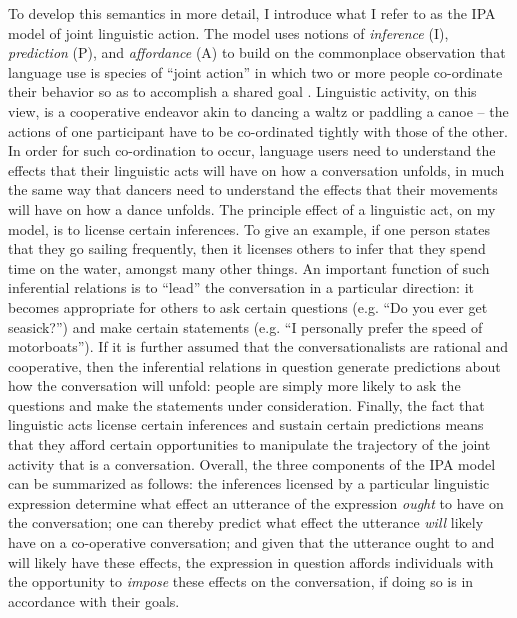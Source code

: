 To develop this semantics in more detail, I introduce what I refer to as the IPA model of joint linguistic action. The model uses notions of \textit{inference} (I), \textit{prediction} (P), and \textit{affordance} (A) to build on the commonplace observation that language use is species of ``joint action'' in which two or more people co-ordinate their behavior so as to accomplish a shared goal \citep{Clark:1996,Lewis:1975}. Linguistic activity, on this view, is a cooperative endeavor akin to dancing a waltz or paddling a canoe \citep{Clark:1996,Brandom:2010} -- the actions of one participant have to be co-ordinated tightly with those of the other. In order for such co-ordination to occur, language users need to understand the effects that their linguistic acts will have on how a conversation unfolds, in much the same way that dancers need to understand the effects that their movements will have on how a dance unfolds. The principle effect of a linguistic act, on my model, is to license certain inferences. To give an example, if one person states that they go sailing frequently, then it licenses others to infer that they spend time on the water, amongst many other things. An important function of such inferential relations is to ``lead'' the conversation in a particular direction: it becomes appropriate for others to ask certain questions (e.g. ``Do you ever get seasick?'') and make certain statements (e.g. ``I personally prefer the speed of motorboats''). If it is further assumed that the conversationalists are rational and cooperative, then the inferential relations in question generate predictions about how the conversation will unfold: people are simply more likely to ask the questions and make the statements under consideration. Finally, the fact that linguistic acts license certain inferences and sustain certain predictions means that they afford certain opportunities to manipulate the trajectory of the joint activity that is a conversation. Overall, the three components of the IPA model can be summarized as follows: the inferences licensed by a particular linguistic expression determine what effect an utterance of the expression \textit{ought} to have on the conversation; one can thereby predict what effect the utterance \textit{will} likely have on a co-operative conversation; and given that the utterance ought to and will likely have these effects, the expression in question affords individuals with the opportunity to \textit{impose} these effects on the conversation, if doing so is in accordance with their goals. 

